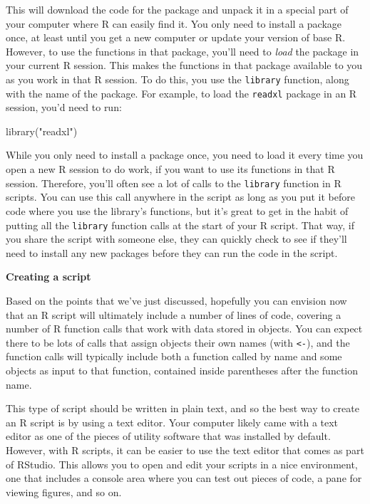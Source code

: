 \documentclass[]{tufte-book}
\newenvironment{Shaded}{}{}
\newcommand{\FunctionTok}[1]{\textcolor[rgb]{0.02,0.16,0.49}{#1}}
\newcommand{\NormalTok}[1]{#1}
\newcommand{\StringTok}[1]{\textcolor[rgb]{0.25,0.44,0.63}{#1}}
\begin{document}
This will download the code for the package and unpack it in a special part of
your computer where R can easily find it. You only need to install a package
once, at least until you get a new computer or update your version of base R.
However, to use the functions in that package, you'll need to \emph{load} the package
in your current R session. This makes the functions in that package available to
you as you work in that R session. To do this, you use the \texttt{library} function,
along with the name of the package. For example, to load the \texttt{readxl} package in
an R session, you'd need to run:

\begin{Shaded}
\begin{Highlighting}[]
\FunctionTok{library}\NormalTok{(}\StringTok{"readxl"}\NormalTok{)}
\end{Highlighting}
\end{Shaded}

While you only need to install a package once, you need to load it every
time you open a new R session to do work, if you want to use its functions in
that R session. Therefore, you'll often see a lot of calls to the \texttt{library}
function in R scripts. You can use this call anywhere in the script as long as
you put it before code where you use the library's functions, but it's great to
get in the habit of putting all the \texttt{library} function calls at the start of
your R script. That way, if you share the script with someone else, they can
quickly check to see if they'll need to install any new packages before they can
run the code in the script.

\textbf{Creating a script}

Based on the points that we've just discussed, hopefully you can envision now
that an R script will ultimately include a number of lines of code, covering a
number of R function calls that work with data stored in objects. You can expect
there to be lots of calls that assign objects their own names (with \texttt{\textless{}-}), and
the function calls will typically include both a function called by name and
some objects as input to that function, contained inside parentheses after the
function name.

This type of script should be written in plain text, and so the best way to
create an R script is by using a text editor. Your computer likely came with a
text editor as one of the pieces of utility software that was installed by
default. However, with R scripts, it can be easier to use the text editor that
comes as part of RStudio. This allows you to open and edit your scripts in a
nice environment, one that includes a console area where you can test out pieces
of code, a pane for viewing figures, and so on.
\end{document}
